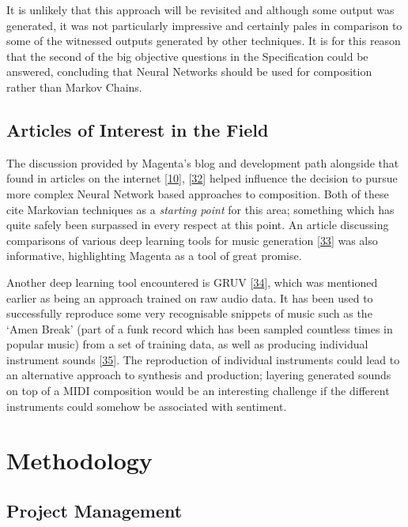 \documentclass[12pt,]{article}
\begin{document}
It is unlikely that this approach will be revisited and although some
output was generated, it was not particularly impressive and certainly
pales in comparison to some of the witnessed outputs generated by other
techniques. It is for this reason that the second of the big objective
questions in the Specification could be answered, concluding that Neural
Networks should be used for composition rather than Markov Chains.

\hypertarget{articles-of-interest-in-the-field}{%
\subsection{Articles of Interest in the
Field}\label{articles-of-interest-in-the-field}}

The discussion provided by Magenta's blog and development path alongside
that found in articles on the internet
{[}\protect\hyperlink{ref-mediumkylemcdonald}{10}{]},
{[}\protect\hyperlink{ref-mkofler}{32}{]} helped influence the decision
to pursue more complex Neural Network based approaches to composition.
Both of these cite Markovian techniques as a \emph{starting point} for
this area; something which has quite safely been surpassed in every
respect at this point. An article discussing comparisons of various deep
learning tools for music generation
{[}\protect\hyperlink{ref-asimovinst}{33}{]} was also informative,
highlighting Magenta as a tool of great promise.

Another deep learning tool encountered is GRUV
{[}\protect\hyperlink{ref-nayebi2015gruv}{34}{]}, which was mentioned
earlier as being an approach trained on raw audio data. It has been used
to successfully reproduce some very recognisable snippets of music such
as the `Amen Break' (part of a funk record which has been sampled
countless times in popular music) from a set of training data, as well
as producing individual instrument sounds
{[}\protect\hyperlink{ref-fiala}{35}{]}. The reproduction of individual
instruments could lead to an alternative approach to synthesis and
production; layering generated sounds on top of a MIDI composition would
be an interesting challenge if the different instruments could somehow
be associated with sentiment.

\hypertarget{methodology}{%
\section{Methodology}\label{methodology}}

\hypertarget{project-management}{%
\subsection{Project Management}\label{project-management}}
\end{document}
